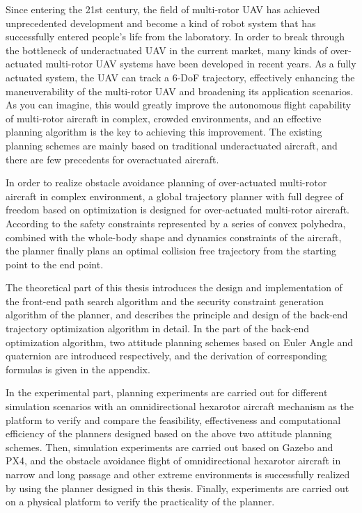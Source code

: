 \begin{eabstract}
  Since entering the 21st century, the field of multi-rotor UAV has achieved unprecedented development and become a kind of robot system that has successfully entered people's life from the laboratory.
In order to break through the bottleneck of underactuated UAV in the current market, many kinds of over-actuated multi-rotor UAV systems have been developed in recent years.
As a fully actuated system, the UAV can track a 6-DoF trajectory, effectively enhancing the maneuverability of the multi-rotor UAV and broadening its application scenarios.
As you can imagine, this would greatly improve the autonomous flight capability of multi-rotor aircraft in complex, crowded environments, and an effective planning algorithm is the key to achieving this improvement.
The existing planning schemes are mainly based on traditional underactuated aircraft, and there are few precedents for overactuated aircraft.

In order to realize obstacle avoidance planning of over-actuated multi-rotor aircraft in complex environment, a global trajectory planner with full degree of freedom based on optimization is designed for over-actuated multi-rotor aircraft.
According to the safety constraints represented by a series of convex polyhedra, combined with the whole-body shape and dynamics constraints of the aircraft, the planner finally plans an optimal collision free trajectory from the starting point to the end point.

The theoretical part of this thesis introduces the design and implementation of the front-end path search algorithm and the security constraint generation algorithm of the planner, and describes the principle and design of the back-end trajectory optimization algorithm in detail.
In the part of the back-end optimization algorithm, two attitude planning schemes based on Euler Angle and quaternion are introduced respectively, and the derivation of corresponding formulas is given in the appendix.

In the experimental part, planning experiments are carried out for different simulation scenarios with an omnidirectional hexarotor aircraft mechanism as the platform to verify and compare the feasibility, effectiveness and computational efficiency of the planners designed based on the above two attitude planning schemes.
Then, simulation experiments are carried out based on Gazebo and PX4, and the obstacle avoidance flight of omnidirectional hexarotor aircraft in narrow and long passage and other extreme environments is successfully realized by using the planner designed in this thesis.
Finally, experiments are carried out on a physical platform to verify the practicality of the planner.
\end{eabstract}
